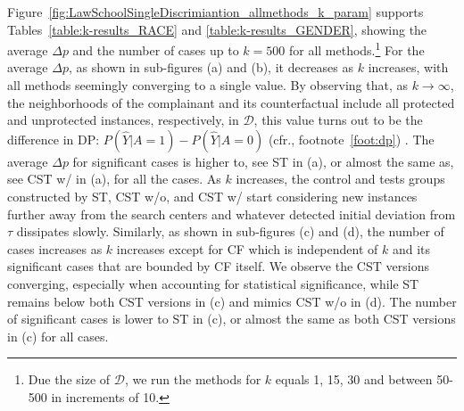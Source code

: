 Figure~\ref{fig:LawSchoolSingleDiscrimiantion_allmethods_k_param} supports Tables~\ref{table:k-results_RACE} and \ref{table:k-results_GENDER}, showing the average $\Delta p$ and the number of cases up to $k=500$ for all methods.\footnote{Due the size of $\mathcal{D}$, we run the methods for $k$ equals 1, 15, 30 and between 50-500 in increments of 10.} 
For the average $\Delta p$, as shown in sub-figures (a) and (b), it decreases as $k$ increases, with all methods seemingly converging to a single value.
%
By observing that, as $k \rightarrow \infty$, the neighborhoods of the complainant and its counterfactual include all protected and unprotected instances, respectively, in $\mathcal{D}$, this value turns out to be the difference in DP: $P(\hat{Y}|A=1) - P(\hat{Y}|A=0)$ (cfr., footnote~\ref{foot:dp}) .
%
The average $\Delta p$ for significant cases is higher to, see ST in (a), or almost the same as, see CST w/ in (a), for all the cases.  
As $k$ increases, the control and tests groups constructed by ST, CST w/o, and CST w/ start considering new instances further away from the search centers and whatever detected initial deviation from $\tau$ dissipates slowly.
%
Similarly, as shown in sub-figures (c) and (d), the number of cases increases as $k$ increases except for CF which is independent of $k$ and its significant cases that are bounded by CF itself. 
We observe the CST versions converging, especially when accounting for statistical significance, while ST remains below both CST versions in (c) and mimics CST w/o in (d).
The number of significant cases is lower to ST in (c), or almost the same as both CST versions in (c) for all cases. 

